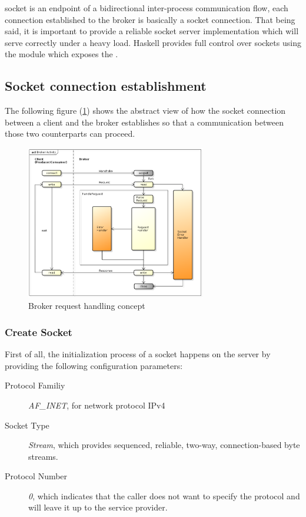 socket is an endpoint of a bidirectional inter-process communication flow, each
connection established to the broker is basically a socket connection. That
being said, it is important to provide a reliable socket server implementation
which will serve correctly under a heavy load. Haskell provides full control
over sockets using the
module which exposes the .

\subsection{Socket connection establishment}

The following figure (\ref{fig:broker-activity}) shows the abstract view of how
the socket connection between a client and the broker establishes so that a
communication between those two counterparts can proceed.

\begin{figure}[H]
    \centering
    \includegraphics[width=0.7\textwidth]{images/broker-activity.png}
    \caption{Broker request handling concept}
    \label{fig:broker-activity}
\end{figure}

\subsubsection{Create Socket}

First of all, the initialization process of a socket happens on the server by providing the following configuration parameters:
\begin{description}
  \item[Protocol Familiy] \textit{AF\_INET}, for network protocol IPv4
  \item[Socket Type] \textit{Stream}, which provides sequenced, reliable, two-way, connection-based byte streams.
  \item[Protocol Number] \textit{0}, which indicates that the caller does not want to specify the protocol and will leave it up to the service provider.
\end{description}

